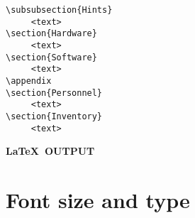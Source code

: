 \begin{verbatim}
\subsubsection{Hints}
     <text>
\section{Hardware}
     <text>
\section{Software}
     <text>
\appendix
\section{Personnel}
     <text>
\section{Inventory}
     <text>
\end{verbatim}

\newpage

\begin{center}
{\bf \LaTeX\ OUTPUT}
\end{center}

\newpage

\section{Font size and type}

